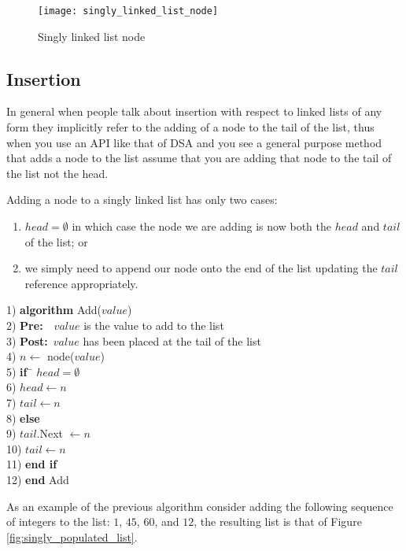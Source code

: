 \begin{figure}
\caption{Singly linked list node}
\begin{center}
\texttt{[image: singly\_linked\_list\_node]}
\end{center}
\end{figure}

\subsection{Insertion} \label{single_insertion}
In general when people talk about insertion with respect to linked lists of any form they implicitly refer to the adding of a node to the tail of the list, thus when you use an API like that of DSA and you see a general purpose method that adds a node to the list assume that you are adding that node to the tail of the list not the head.

Adding a node to a singly linked list has only two cases: 
\begin{enumerate}
\item $head = \emptyset$ in which case the node we are adding is now both the $head$ and $tail$ of the list; or
\item we simply need to append our node onto the end of the list updating the $tail$ reference appropriately.
\end{enumerate}

\begin{tabbing}
1)  \textbf{alg}\= \textbf{orithm} Add($value$) \\
2)  \> \textbf{Pre:}~~$value$ is the value to add to the list \\
3)  \> \textbf{Post:}~$value$ has been placed at the tail of the list \\
4)  \> $n \leftarrow$ node($value$) \\
5)  \> \textbf{if}~\= $head = \emptyset$ \\
6)  \> \> $head \leftarrow n$ \\
7)  \> \> $tail \leftarrow n$ \\
8)  \> \textbf{else} \\
9)  \> \> $tail$.Next $\leftarrow n$ \\
10) \> \> $tail \leftarrow n$ \\
11) \> \textbf{end if} \\
12) \textbf{end} Add \\
\end{tabbing}

As an example of the previous algorithm consider adding the following sequence of integers to the list: $1$, $45$, $60$, and $12$, the resulting list is that of Figure \ref{fig:singly_populated_list}.

